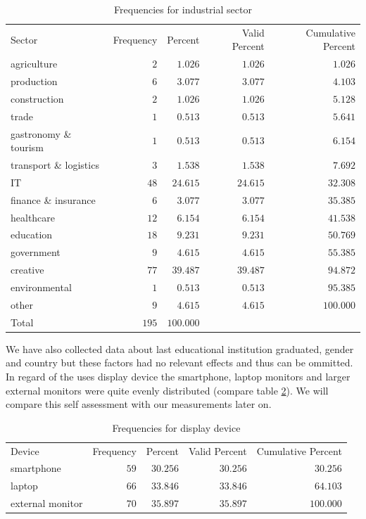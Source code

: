 \documentclass[
  a4paper,  %
  twoside,  %
  bibliography=totoc,
  headsepline,
  cleardoublepage=empty,
  parskip=half,
  draft=false
]{scrbook}
\begin{document}
\begin{table}[h]
	\centering
	\caption{Frequencies for industrial sector}
	\label{tab:frequenciesForBranch}
	{
		\begin{tabular}{lrrrr}
			\toprule
			Sector & Frequency & Percent & Valid Percent & Cumulative Percent  \\
			\cmidrule[0.4pt]{1-5}
			agriculture & $2$ & $1.026$ & $1.026$ & $1.026$  \\
			production & $6$ & $3.077$ & $3.077$ & $4.103$  \\
			construction & $2$ & $1.026$ & $1.026$ & $5.128$  \\
			trade & $1$ & $0.513$ & $0.513$ & $5.641$  \\
			gastronomy \& tourism & $1$ & $0.513$ & $0.513$ & $6.154$  \\
			transport \& logistics & $3$ & $1.538$ & $1.538$ & $7.692$  \\
			IT & $48$ & $24.615$ & $24.615$ & $32.308$  \\
			finance \& insurance & $6$ & $3.077$ & $3.077$ & $35.385$  \\
			healthcare & $12$ & $6.154$ & $6.154$ & $41.538$  \\
			education & $18$ & $9.231$ & $9.231$ & $50.769$  \\
			government & $9$ & $4.615$ & $4.615$ & $55.385$  \\
			creative & $77$ & $39.487$ & $39.487$ & $94.872$  \\
			environmental & $1$ & $0.513$ & $0.513$ & $95.385$  \\
			other & $9$ & $4.615$ & $4.615$ & $100.000$  \\
			Total & $195$ & $100.000$ & $ $ & $ $  \\
			\bottomrule
		\end{tabular}
	}
\end{table}
We have also collected data about last educational institution graduated, gender and country but these factors had no relevant effects and thus can be ommitted. \\
In regard of the uses display device the smartphone, laptop monitors and larger external monitors were quite evenly distributed (compare table \ref{tab:frequenciesForDevice}). We will compare this self assessment with our measurements later on.
\begin{table}[h]
	\centering
	\caption{Frequencies for display device}
	\label{tab:frequenciesForDevice}
	{
		\begin{tabular}{lrrrr}
			\toprule
			Device & Frequency & Percent & Valid Percent & Cumulative Percent  \\
			\cmidrule[0.4pt]{1-5}
			smartphone & $59$ & $30.256$ & $30.256$ & $30.256$  \\
			laptop & $66$ & $33.846$ & $33.846$ & $64.103$  \\
			external monitor & $70$ & $35.897$ & $35.897$ & $100.000$  \\
			\bottomrule
		\end{tabular}
	}
\end{table}
\end{document}
